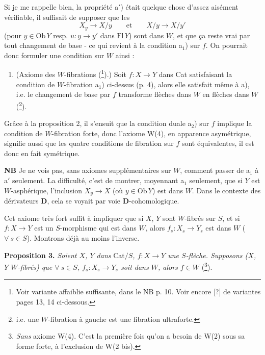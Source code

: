\documentclass[11pt]{article}
\newcommand{\msp}[1]{\marginpar{\footnotesize [#1]}}
\begin{document}
Si je me rappelle bien, la propriété a$'$) était quelque chose d'assez aisément vérifiable, il suffisait de supposer que les
\[ X_y \longrightarrow X/y \qquad \text{et} \qquad X/y \longrightarrow X/y' \]
(pour $y \in \mathrm{Ob}\,Y$ resp. $u : y \longrightarrow y'$ dans $\mathrm{Fl}\,Y$) sont dans $W$, et que ça reste vrai par tout changement de base - ce qui revient à la condition a$_1$) sur $f$. On pourrait donc formuler une condition sur $W$ ainsi :

\begin{enumerate}[leftmargin=*]
\item[\textbf{W(4)}] (Axiome des $W$-fibrations (\footnote[6]{Voir variante affaiblie suffisante, dans le NB p. 10. Voir encore [?] de variantes pages 13, 14 ci-dessous.}).) Soit $f : X \longrightarrow Y$ dans Cat satisfaisant la condition de $W$-fibration a$_1$) ci-dessus (p. 4), alors elle satisfait même à a), i.e. le changement de base par $f$ transforme flèches dans $W$ en flèches dans $W$ (\footnote[7]{i.e. une $W$-fibration à gauche est une fibration ultraforte.}).
\end{enumerate}

Grâce à la proposition 2, il s'ensuit que la condition duale a$_2$) sur $f$ implique la condition de $W$-fibration forte, donc l'axiome W(4), en apparence asymétrique, signifie aussi que les quatre conditions de fibration sur $f$ sont équivalentes, il est donc en fait symétrique.

\textbf{NB} Je ne vois pas, sans axiomes supplémentaires sur $W$, comment passer de a$_1$ à a$'$ seulement. La difficulté, c'est de montrer, moyennant a$_1$ seulement, que si $Y$ est $W$-asphérique, l'inclusion $X_y \longrightarrow X$ (où $y \in \mathrm{Ob}\,Y$) est dans $W$. Dans le contexte des dérivateurs \textbf{D}, cela se voyait par voie \textbf{D}-cohomologique.

Cet axiome très fort suffit à impliquer que si $X$, $Y$ sont $W$-fibrés sur $S$, et si $f : X \longrightarrow Y$ est un $S$-morphisme qui est dans $W$, alors $f_s : X_s \longrightarrow Y_s$ est dans $W$ ($\forall\ s \in S$). Montrons déjà au moins l'inverse.

\msp{page 6}

\textbf{Proposition 3.} \textit{Soient $X$, $Y$ dans} Cat$/S$\textit{, $f : X \longrightarrow Y$ une $S$-flèche. Supposons ($X$, $Y$ $W$-fibrés) que $\forall\ s \in S$, $f_s : X_s \longrightarrow Y_s$ soit dans $W$, alors $f \in W$} (\footnote[8]{\textit{Sans} axiome W(4). C'est la première fois qu'on a besoin de W(2) sous sa forme forte, à l'exclusion de W(2 bis).}).
\end{document}
